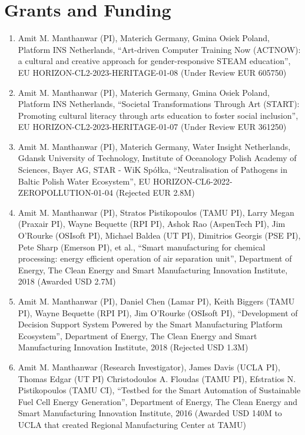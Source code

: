 \documentclass[10pt]{article}
\begin{document}
\section{Grants and Funding}
\begin{enumerate}[nosep]
\item Amit M. Manthanwar (PI), Materich Germany, Gmina Osiek Poland, Platform INS Netherlands, ``Art-driven Computer Training Now (ACTNOW): a cultural and creative approach for gender-responsive STEAM education'', EU HORIZON-CL2-2023-HERITAGE-01-08 (Under Review EUR 605750)
\item Amit M. Manthanwar (PI), Materich Germany, Gmina Osiek Poland, Platform INS Netherlands, ``Societal Transformations Through Art (START): Promoting cultural literacy through arts education to foster social inclusion'', EU HORIZON-CL2-2023-HERITAGE-01-07 (Under Review EUR 361250)
\item Amit M. Manthanwar (PI), Materich Germany, Water Insight Netherlands, Gdansk University of Technology, Institute of Oceanology Polish Academy of Sciences, Bayer AG, STAR - WiK Spółka, ``Neutralisation of Pathogens in Baltic Polish Water Ecosystem'', EU HORIZON-CL6-2022-ZEROPOLLUTION-01-04 (Rejected EUR 2.8M)
\item Amit M. Manthanwar (PI), Stratos Pistikopoulos (TAMU PI), Larry Megan (Praxair PI), Wayne Bequette (RPI PI), Ashok Rao (AspenTech PI), Jim O’Rourke (OSIsoft PI), Michael Baldea (UT PI), Dimitrios Georgis (PSE PI), Pete Sharp (Emerson PI), et al., ``Smart manufacturing for chemical processing: energy efficient operation of air separation unit'', Department of Energy, The Clean Energy and Smart Manufacturing Innovation Institute, 2018    (Awarded USD 2.7M)

\item Amit M. Manthanwar (PI), Daniel Chen (Lamar PI), Keith Biggers (TAMU PI), Wayne Bequette (RPI PI), Jim O’Rourke (OSIsoft PI), ``Development of Decision Support System Powered by the Smart Manufacturing Platform Ecosystem'', Department of Energy, The Clean Energy and Smart Manufacturing Innovation Institute, 2018 (Rejected USD 1.3M)

\item Amit M. Manthanwar (Research Investigator), James Davis (UCLA PI), Thomas Edgar (UT PI) Christodoulos A. Floudas (TAMU PI), Efstratios N. Pistikopoulos (TAMU CI), ``Testbed for the Smart Automation of Sustainable Fuel Cell Energy Generation'', Department of Energy, The Clean Energy and Smart Manufacturing Innovation Institute, 2016 (Awarded USD 140M to UCLA that created Regional Manufacturing Center at TAMU)


\end{enumerate}
\end{document}
